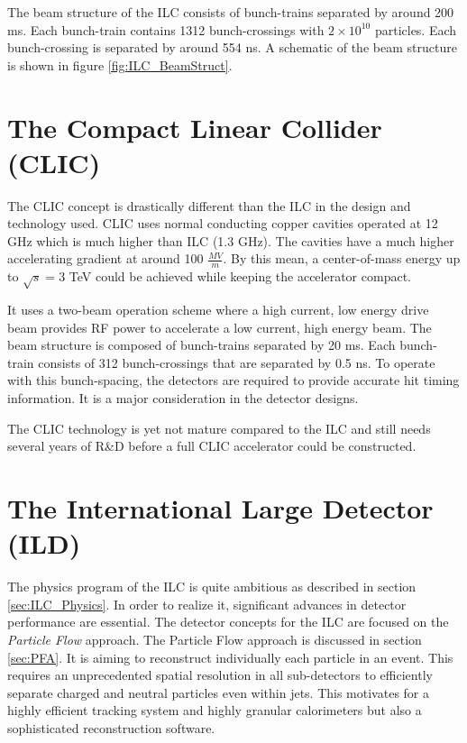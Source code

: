 The beam structure of the ILC consists of bunch-trains separated by around 200 ms. Each bunch-train contains 1312 bunch-crossings with $2 \times 10^{10}$ particles. Each bunch-crossing is separated by around 554 ns. A schematic of the beam structure is shown in figure \ref{fig:ILC_BeamStruct}.

\section{The Compact Linear Collider (CLIC)}

The CLIC concept \cite{CLIC_CDR} is drastically different than the ILC in the design and technology used. CLIC uses normal conducting copper cavities operated at 12 GHz which is much higher than ILC (1.3 GHz). The cavities have a much higher accelerating gradient at around 100 $\frac{MV}{m}$. By this mean, a center-of-mass energy up to $\sqrt{s} = 3$ TeV could be achieved while keeping the accelerator compact.

It uses a two-beam operation scheme where a high current, low energy drive beam provides RF power to accelerate a low current, high energy beam. The beam structure is composed of bunch-trains separated by 20 ms. Each bunch-train consists of 312 bunch-crossings that are separated by 0.5 ns. To operate with this bunch-spacing, the detectors are required to provide accurate hit timing information. It is a major consideration in the detector designs.

The CLIC technology is yet not mature compared to the ILC and still needs several years of R\&D before a full CLIC accelerator could be constructed.

\section{The International Large Detector (ILD)}
\label{sec:ILD}

The physics program of the ILC is quite ambitious as described in section \ref{sec:ILC_Physics}. In order to realize it, significant advances in detector performance are essential. The detector concepts for the ILC are focused on the \textit{Particle Flow} approach. The Particle Flow approach is discussed in section \ref{sec:PFA}. It is aiming to reconstruct individually each particle in an event. This requires an unprecedented spatial resolution in all sub-detectors to efficiently separate charged and neutral particles even within jets. This motivates for a highly efficient tracking system and highly granular calorimeters but also a sophisticated reconstruction software.

